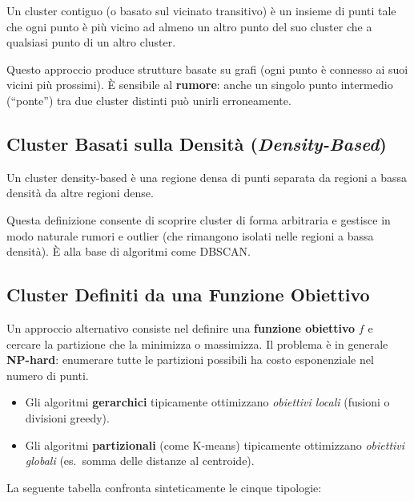 \begin{definition}
Un cluster contiguo (o basato sul vicinato transitivo) è un insieme di punti tale che ogni punto è più vicino ad almeno un altro punto del suo cluster che a qualsiasi punto di un altro cluster.
\end{definition}

Questo approccio produce strutture basate su grafi (ogni punto è connesso ai suoi vicini più prossimi). È sensibile al \textbf{rumore}: anche un singolo punto intermedio (``ponte'') tra due cluster distinti può unirli erroneamente.

\subsection{Cluster Basati sulla Densità (\textit{Density-Based})}

\begin{definition}
Un cluster density-based è una regione densa di punti separata da regioni a bassa densità da altre regioni dense.
\end{definition}

Questa definizione consente di scoprire cluster di forma arbitraria e gestisce in modo naturale rumori e outlier (che rimangono isolati nelle regioni a bassa densità). È alla base di algoritmi come DBSCAN.

\subsection{Cluster Definiti da una Funzione Obiettivo}

Un approccio alternativo consiste nel definire una \textbf{funzione obiettivo} $f$ e cercare la partizione che la minimizza o massimizza. Il problema è in generale \textbf{NP-hard}: enumerare tutte le partizioni possibili ha costo esponenziale nel numero di punti.

\begin{itemize}
  \item Gli algoritmi \textbf{gerarchici} tipicamente ottimizzano \textit{obiettivi locali} (fusioni o divisioni greedy).
  \item Gli algoritmi \textbf{partizionali} (come K-means) tipicamente ottimizzano \textit{obiettivi globali} (es.\ somma delle distanze al centroide).
\end{itemize}

La seguente tabella confronta sinteticamente le cinque tipologie:

